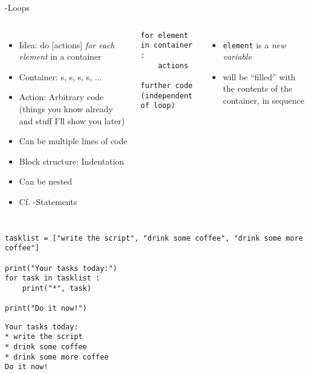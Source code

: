 \begin{frame}[fragile]{-Loops}
%
\begin{columns}[T]
\begin{itemize}
\item Idea: do [actions] \emph{for each element} in a container
\item Container: s, s, s, s, ...
\item Action: Arbitrary code (things you know already and stuff I'll show you later)
\item Can be multiple lines of code
\item[\Thus] Block structure: Indentation
\item Can be nested
\item Cf. -Statements
\end{itemize}
%
\begin{codebox}
\begin{verbatim}
for element in container :
    actions

further code (independent of loop)
\end{verbatim}
\end{codebox}
%
\begin{itemize}
\item \texttt{element} is a \emph{new variable}
\item will be \enquote{filled} with the contents of the container, in sequence
\end{itemize}
\end{columns}
%
\end{frame}


\begin{frame}[fragile]
%
\begin{codebox}
\begin{verbatim}
tasklist = ["write the script", "drink some coffee", "drink some more coffee"]

print("Your tasks today:")
for task in tasklist :
    print("*", task)

print("Do it now!")
\end{verbatim}
\end{codebox}
%
\begin{cmdbox}
\begin{verbatim}
Your tasks today:
* write the script
* drink some coffee
* drink some more coffee
Do it now!
\end{verbatim}
\end{cmdbox}
%
\end{frame}


